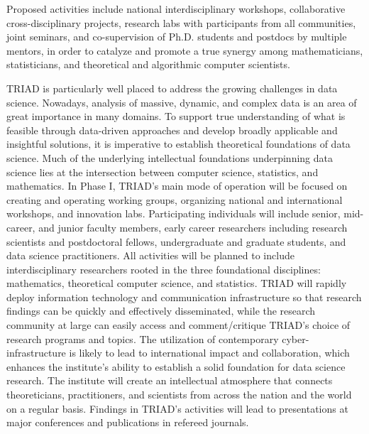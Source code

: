 \documentclass[12pt]{article}
\begin{document}
Proposed activities include national interdisciplinary workshops, collaborative
cross-disciplinary projects, research labs with participants from all communities,
joint seminars, and co-supervision of Ph.D. students and postdocs by multiple mentors,
in order to catalyze and promote a true synergy among mathematicians, statisticians,
and theoretical and algorithmic computer scientists.

TRIAD is particularly well placed to address the growing challenges in data science.
Nowadays, analysis of massive, dynamic, and complex data is an area of great importance
in many domains. To support true understanding of what is feasible through data-driven
approaches and develop broadly applicable and insightful solutions, it is imperative to
establish theoretical foundations of data science. Much of the underlying intellectual
foundations underpinning data science lies at the intersection between computer science, statistics, and mathematics.
In Phase I, TRIAD's main mode of operation will be focused on creating and operating
working groups, organizing national and international workshops, and innovation labs.
Participating individuals will include senior, mid-career, and junior faculty members,
early career researchers including research scientists and postdoctoral fellows,
undergraduate and graduate students, and data science practitioners.
All activities will be planned to include interdisciplinary researchers rooted in the
three foundational disciplines: mathematics, theoretical computer science, and statistics.
TRIAD will rapidly deploy information technology and communication infrastructure so that
research findings can be quickly and effectively disseminated, while the research community
at large can easily access and comment/critique TRIAD's choice of research programs and topics.
The utilization of contemporary cyber-infrastructure is likely to lead to international impact
and collaboration, which enhances the institute's ability to establish a solid foundation for
data science research. The institute will create an intellectual atmosphere that connects
theoreticians, practitioners, and scientists from across the nation and the world on a
regular basis. Findings in TRIAD's activities will lead to presentations at major conferences
and publications in refereed journals.
\end{document}
